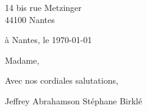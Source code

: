 \documentclass[12 pt]{article}
\begin{document}
14 bis rue Metzinger\\
44100 Nantes

\vspace{3mm}

\hbox{\hspace{.6\linewidth}\vtop{
}}

\vspace{1cm}

à Nantes, le \today\\[2mm]
\vspace{1cm}

Madame,



Avec nos cordiales salutations,

\vspace{2cm}
Jeffrey Abrahamson \hspace{4cm} Stéphane Birklé
\end{document}
